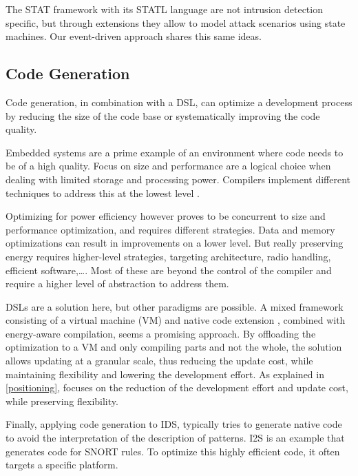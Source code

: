 \documentclass[conference]{IEEEtran}
\begin{document}
The STAT framework with its STATL
language \cite{eckmann2002statl,vigna2003designing} are not intrusion detection
specific, but through extensions they allow to model attack scenarios using
state machines. Our event-driven approach shares this same ideas.

\subsection{Code Generation}

Code generation, in combination with a DSL, can optimize a development process
by reducing the size of the code base or systematically improving the code
quality.

Embedded systems are a prime example of an environment where code needs to be
of a high quality. Focus on size and performance are a logical choice when
dealing with limited storage and processing power. Compilers implement
different techniques to address this at the lowest level \cite{leupers2000code,
marwedel2002code}.

Optimizing for power efficiency however proves to be concurrent to size and
performance optimization, and requires different strategies. Data and memory
optimizations \cite{panda2001data} can result in improvements on a lower level.
But really preserving energy requires higher-level strategies, targeting
architecture, radio handling, efficient software,\dots \cite{naik2001software}.
Most of these are beyond the control of the compiler and require a higher level
of abstraction to address them.

DSLs are a solution here, but other paradigms are possible. A mixed framework
consisting of a virtual machine (VM) and native code
extension \cite{sadilek2007energy}, combined with energy-aware compilation,
seems a promising approach. By offloading the optimization to a VM and only
compiling parts and not the whole, the solution allows updating at a granular
scale, thus reducing the update cost, while maintaining flexibility and
lowering the development effort. As explained in \ref{positioning}, \NAME
focuses on the reduction of the development effort and update cost, while
preserving flexibility.

Finally, applying code generation to IDS, typically tries to generate native
code to avoid the interpretation of the description of patterns.
I2S \cite{charitakis2003code} is an example that generates code for
SNORT \cite{roesch1999snort} rules. To optimize this highly efficient code, it
often targets a specific platform.
\end{document}

